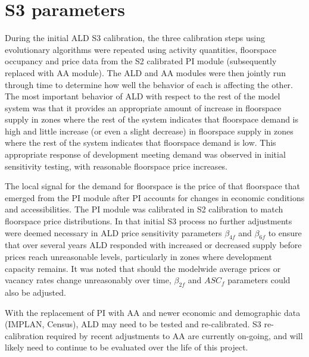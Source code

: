 \section{S3 parameters}
During the initial ALD S3 calibration, the three calibration steps using evolutionary algorithms were repeated using activity quantities, floorspace occupancy and price data from the S2 calibrated PI module (subsequently replaced with AA module). The ALD and AA modules were then jointly run through time to determine how well the behavior of each is affecting the other. The most important behavior of ALD with respect to the rest of the model system was that it provides an appropriate amount of increase in floorspace supply in zones where the rest of the system indicates that floorspace demand is high and little increase (or even a slight decrease) in floorspace supply in zones where the rest of the system indicates that floorspace demand is low. This appropriate response of development meeting demand was observed in initial sensitivity testing, with reasonable floorspace price increases.

The local signal for the demand for floorspace is the price of that floorspace that emerged from the PI module after PI accounts for changes in economic conditions and accessibilities. The PI module was calibrated in S2 calibration to match floorspace price distributions. In that initial S3 process no further adjustments were deemed necessary in ALD price sensitivity parameters $\beta_{4f}$ and $\beta_{6f}$ to ensure that over several years ALD responded with increased or decreased supply before prices reach unreasonable levels, particularly in zones where development capacity remains. It was noted that should the modelwide average prices or vacancy rates change unreasonably over time, $\beta_{2f}$ and $ASC_f$ parameters could also be adjusted. 

With the replacement of PI with AA and newer economic and demographic data (IMPLAN, Census), ALD may need to be tested and re-calibrated. S3 re-calibration required by recent adjustments to AA are currently on-going, and will likely need to continue to be evaluated over the life of this project.
